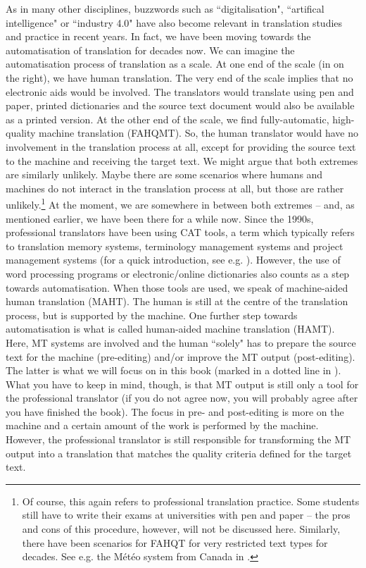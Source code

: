 As in many other disciplines, buzzwords such as ``digitalisation", ``artifical intelligence" or ``industry 4.0" have also become relevant in translation studies and practice in recent years. In fact, we have been moving towards the automatisation of translation for decades now. We can imagine the automatisation process of translation as a scale. At one end of the scale (in  on the right), we have human translation. The very end of the scale implies that no electronic aids would be involved. The translators would translate using pen and paper, printed dictionaries and the source text document would also be available as a printed version. At the other end of the scale, we find fully-automatic, high-quality machine translation (FAHQMT). So, the human translator would have no involvement in the translation process at all, except for providing the source text to the machine and receiving the target text. We might argue that both extremes are similarly unlikely. Maybe there are some scenarios where humans and machines do not interact in the translation process at all, but those are rather unlikely.\footnote{Of course, this again refers to professional translation practice. Some students still have to write their exams at universities with pen and paper -- the pros and cons of this procedure, however, will not be discussed here. Similarly, there have been scenarios for FAHQT for very restricted text types for decades. See e.g. the Météo system from Canada in .} At the moment, we are somewhere in between both extremes -- and, as mentioned earlier, we have been there for a while now. Since the 1990s, professional translators have been using CAT tools, a term which typically refers to translation memory systems, terminology management systems and project management systems (for a quick introduction, see e.g. \citealt{folaron2010translation}). 
However, the use of word processing programs or electronic/online dictionaries also counts as a step towards automatisation. When those tools are used, we speak of machine-aided human translation (MAHT). The human is still at the centre of the translation process, but is supported by the machine. One further step towards automatisation is what is called human-aided machine translation (HAMT). Here, MT systems are involved and the human ``solely" has to prepare the source text for the machine (pre-editing) and/or improve the MT output (post-editing). The latter is what we will focus on in this book (marked in a dotted line in ). What you have to keep in mind, though, is that MT output is still only a tool for the professional translator (if you do not agree now, you will probably agree after you have finished the book). The focus in pre- and post-editing is more on the machine and a certain amount of the work is performed by the machine. However, the professional translator is still responsible for transforming the MT output into a translation that matches the quality criteria defined for the target text.



